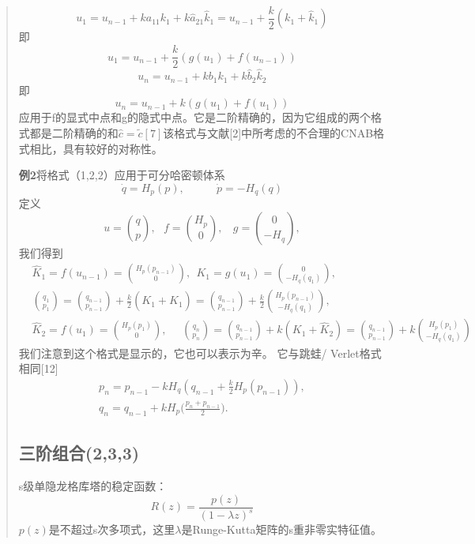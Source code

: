 \documentclass{article}
\begin{document}
\begin{CJK}{UTF8}{gkai}
\begin{quotation}
\begin{equation*}
u_{1}=u_{n-1}+ka_{11}k_{1}+k\hat{a}_{21}\hat{k}_{1}=u_{n-1}+\frac{k}{2}(k_{1}+\hat{k}_{1})
\end{equation*}
即
\begin{equation*}
u_{1}=u_{n-1}+\frac{k}{2}(g(u_{1})+f(u_{n-1}))
\end{equation*}
\begin{equation*}
u_{n}=u_{n-1}+kb_{1}k_{1}+k\hat{b}_{2}\hat{k}_{2}
\end{equation*}
即
\begin{equation*}
u_{n}=u_{n-1}+k(g(u_{1})+f(u_{1}))
\end{equation*}
应用于f的显式中点和g的隐式中点。它是二阶精确的，因为它组成的两个格式都是二阶精确的和$\widehat{c}=\tilde{c}[7]$该格式与文献[2]中所考虑的不合理的CNAB格式相比，具有较好的对称性。

\textbf{例2}将格式（1,2,2）应用于可分哈密顿体系
\begin{equation}
\dot{q}=H_{p}(p),~~~~~~~~~~~~~\dot{p}=-H_{q}(q)
\end{equation}
定义
\begin{equation}
u=\binom{q}{p},~~~f=\binom{H_{p}}{0},~~~~g=\binom{0}{-H_{q}},
\end{equation}
我们得到
\begin{align}
&\widehat{K}_{1}=f(u_{n-1})=\binom{H_{p}(p_{n-1})}{0},~~K_{1}=g(u_{1})=\binom{0}{-H_{q}(q_{1})},\\
&\binom{q_{1}}{p_{1}}=\binom{q_{n-1}}{p_{n-1}}+\frac{k}{2}(K_{1}+\widehat{K}_{1})=\binom{q_{n-1}}{p_{n-1}}+\frac{k}{2}\binom{H_{p}(p_{n-1})}{-H_{q}(q_{1})},\\
&\widehat{K}_{2}=f(u_{1})=\binom{H_{p}(p_{1})}{0},~~~~~~\binom{q_{n}}{p_{n}}=\binom{q_{n-1}}{p_{n-1}}+k(K_{1}+\widehat{K}_{2})=\binom{q_{n-1}}{p_{n-1}}+k\binom{H_{p}(p_{1})}{-H_{q}(q_{1})}
\end{align}
我们注意到这个格式是显示的，它也可以表示为辛。 它与跳蛙/ Verlet格式相同[12] 
\begin{gather}
p_{n}=p_{n-1}-kH_{q}(q_{n-1}+\frac{k}{2}H_{p}(p_{n-1})),\\
q_{n}=q_{n-1}+kH_{p}\bigg(\frac{p_{n}+p_{n-1}}{2}\biggl).
\end{gather}
\subsection{三阶组合(2,3,3)}
s级单隐龙格库塔的稳定函数：
\begin{equation*}
R(z)=\frac{p(z)}{(1-\lambda z)^s}
\end{equation*}
$p(z)$是不超过s次多项式，这里$\lambda$是Runge-Kutta矩阵的s重非零实特征值。


\end{quotation}
\end{CJK}
\end{document}
